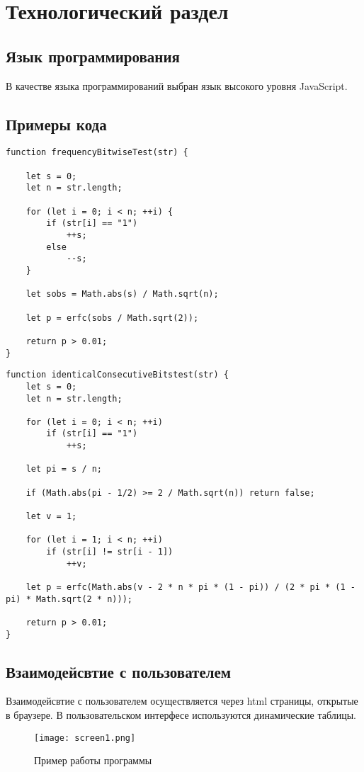 \chapter{Технологический раздел}

\section{Язык программирования}
В качестве языка программирований выбран язык высокого уровня JavaScript.

\section{Примеры кода}

\begin{lstlisting}[caption={Частотный побитовый тест}]
function frequencyBitwiseTest(str) {

    let s = 0;
    let n = str.length;

    for (let i = 0; i < n; ++i) {
        if (str[i] == "1")
            ++s;
        else
            --s;
    }

    let sobs = Math.abs(s) / Math.sqrt(n);

    let p = erfc(sobs / Math.sqrt(2));

    return p > 0.01;
}
\end{lstlisting}

\begin{lstlisting}[caption={Тест на одинаковые идущие подряд биты}]
function identicalConsecutiveBitstest(str) {
    let s = 0;
    let n = str.length;

    for (let i = 0; i < n; ++i)
        if (str[i] == "1")  
            ++s;

    let pi = s / n;

    if (Math.abs(pi - 1/2) >= 2 / Math.sqrt(n)) return false;

    let v = 1;

    for (let i = 1; i < n; ++i)
        if (str[i] != str[i - 1])   
            ++v;

    let p = erfc(Math.abs(v - 2 * n * pi * (1 - pi)) / (2 * pi * (1 - pi) * Math.sqrt(2 * n)));

    return p > 0.01;
}
\end{lstlisting}

\section{Взаимодейсвтие с пользователем}

Взаимодейсвтие с пользователем осуществляется через html страницы, открытые в браузере. В пользовательском интерфесе используются динамические таблицы. 

\begin{figure}
  \centering
  \texttt{[image: screen1.png]}
  \caption{Пример работы программы}
\end{figure}
